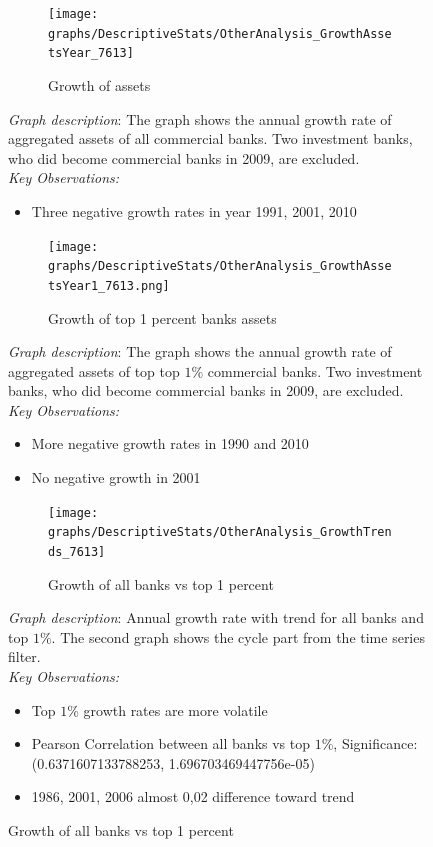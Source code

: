 \documentclass[12pt, a4paper]{article} %
\begin{document}
\begin{figure}[hbtp]
\begin{figure}[hbtp]
\centering
\caption{Growth of assets}
\texttt{[image: graphs/DescriptiveStats/OtherAnalysis\_GrowthAssetsYear\_7613]}
\end{figure}

\noindent \textit{Graph description}: The graph shows the annual growth rate of aggregated assets of all commercial banks. Two investment banks, who did become commercial banks in 2009, are excluded. \\

\noindent \textit{Key Observations:}
\begin{itemize}
\item Three negative growth rates in year 1991, 2001, 2010
\end{itemize}

\begin{figure}[hbtp]
\centering
\caption{Growth of top 1 percent banks assets}
\texttt{[image: graphs/DescriptiveStats/OtherAnalysis\_GrowthAssetsYear1\_7613.png]}
\end{figure}

\noindent \textit{Graph description}: The graph shows the annual growth rate of aggregated assets of top top $1\%$ commercial banks. Two investment banks, who did become commercial banks in 2009, are excluded. \\

\noindent \textit{Key Observations:}
\begin{itemize}
\item More negative growth rates in 1990 and 2010
\item No negative growth in 2001

\end{itemize}

\begin{figure}[hbtp]
\centering
\caption{Growth of all banks vs top 1 percent}
\texttt{[image: graphs/DescriptiveStats/OtherAnalysis\_GrowthTrends\_7613]}
\end{figure}

\noindent \textit{Graph description}: Annual growth rate with trend for all banks and top $1\%$. The second graph shows the cycle part from the time series filter. \\

\noindent \textit{Key Observations:}
\begin{itemize}
\item Top $1\%$ growth rates are more volatile
\item Pearson Correlation between all banks vs top $1\%$, Significance: (0.6371607133788253, 1.696703469447756e-05)
\item 1986, 2001, 2006 almost 0,02 difference toward trend
\end{itemize}


\end{figure}
\end{document}

